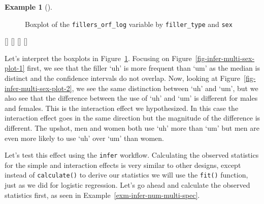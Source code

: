 \documentclass[
  letterpaper,
  krantz1]{latex/krantz-mod}
\newcommand{\cindex}[1]{%
  \StrSubstitute{#1}{_}{\_}[\temp]%
  \index{\temp}%
}
\theoremstyle{definition}
\theoremstyle{definition}
\newtheorem{example}{Example}[chapter]
\theoremstyle{remark}
\begin{document}
\begin{example}[]
\begin{figure}[!htb]
\begin{minipage}{0.50\linewidth}
{}


\end{minipage}%

\caption{\label{fig-infer-multi-sex-plot}Boxplot of the
\texttt{fillers\_orf\_log} variable by \texttt{filler\_type} and
\texttt{sex}}

\end{figure}%

\cindex{ggplot()}\cindex{aes()}\cindex{geom_boxplot()}\cindex{labs()}

\end{example}

Let's interpret the boxplots in Figure~\ref{fig-infer-multi-sex-plot}.
Focusing on Figure~\ref{fig-infer-multi-sex-plot-1} first, we see that
the filler `uh' is more frequent than `um' as the median is distinct and
the confidence intervals do not overlap. Now, looking at
Figure~\ref{fig-infer-multi-sex-plot-2}, we see the same distinction
between `uh' and `um', but we also see that the difference between the
use of `uh' and `um' is different for males and females. This is the
interaction effect we hypothesized. In this case the interaction effect
goes in the same direction but the magnitude of the difference is
different. The upshot, men and women both use `uh' more than `um' but
men are even more likely to use `uh' over `um' than women.

Let's test this effect using the \texttt{infer} workflow. Calculating
the observed statistics for the simple and interaction effects is very
similar to other designs, except instead of \texttt{calculate()} to
derive our statistics we will use the \texttt{fit()} function, just as
we did for logistic regression. Let's go ahead and calculate the
observed statistics first, as seen in
Example~\ref{exm-infer-num-multi-spec}.
\end{document}
